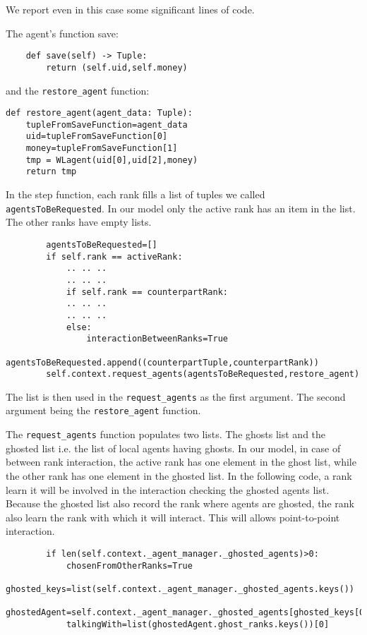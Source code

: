\documentclass{article}
\begin{document}
We report even in this case some significant lines of code.

The agent's function save:

\begin{verbatim}
    def save(self) -> Tuple:
        return (self.uid,self.money)
\end{verbatim}

and the \verb+restore_agent+ function:

\begin{verbatim}
def restore_agent(agent_data: Tuple):
    tupleFromSaveFunction=agent_data
    uid=tupleFromSaveFunction[0]
    money=tupleFromSaveFunction[1]
    tmp = WLagent(uid[0],uid[2],money)
    return tmp
\end{verbatim}


In the step function, each rank fills a list of tuples we called \verb+agentsToBeRequested+.
In our model only the active rank has an item in the list. The other ranks have empty lists.

\begin{verbatim}
        agentsToBeRequested=[]
        if self.rank == activeRank:
            .. .. ..
            .. .. ..
            if self.rank == counterpartRank:
            .. .. ..
            .. .. ..
            else:
                interactionBetweenRanks=True
                agentsToBeRequested.append((counterpartTuple,counterpartRank))
        self.context.request_agents(agentsToBeRequested,restore_agent)
\end{verbatim}
The list is then used in the \verb+request_agents+ as the first argument. The second argument being the \verb+restore_agent+ function.

The \verb+request_agents+ function populates two lists. The ghosts list and the ghosted list i.e. the list of local agents having ghosts. 
In our model, in case of between rank interaction, the active rank has one element in the ghost list, while the other rank has one element in the ghosted list.
In the following code, a rank learn it will be involved in the interaction checking the ghosted agents list. Because the ghosted list also record the rank where agents are ghosted, the rank also learn the rank with which it will interact. This will allows point-to-point interaction.

\begin{verbatim}
        if len(self.context._agent_manager._ghosted_agents)>0:
            chosenFromOtherRanks=True
            ghosted_keys=list(self.context._agent_manager._ghosted_agents.keys())
            ghostedAgent=self.context._agent_manager._ghosted_agents[ghosted_keys[0]]
            talkingWith=list(ghostedAgent.ghost_ranks.keys())[0]
\end{verbatim}
\end{document}
